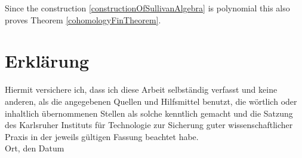 \documentclass[12pt,a4paper]{scrartcl}
\numberwithin{equation}{section}
\begin{document}
 Since the construction \ref{constructionOfSullivanAlgebra} is polynomial this also proves Theorem \ref{cohomologyFinTheorem}.
  \newpage
  
{}

 
      

\newpage
  
 \thispagestyle{empty}


\vspace*{8cm}


\section*{Erklärung}

Hiermit versichere ich, dass ich diese Arbeit selbständig verfasst und keine anderen, als die angegebenen Quellen und Hilfsmittel benutzt, die wörtlich oder inhaltlich übernommenen Stellen als solche kenntlich gemacht und die Satzung des Karlsruher Instituts für Technologie zur Sicherung guter wissenschaftlicher Praxis in der jeweils gültigen Fassung beachtet habe. \\[2ex] 

\noindent
Ort, den Datum\\[5ex]

\end{document}
